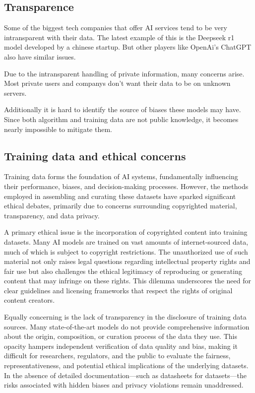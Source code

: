 \cite{AiDataBias}

\subsection{Transparence}
\label{subsec:transparence}

Some of the biggest tech companies that offer AI services tend to be very intransparent with their data. 
The latest example of this is the Deepseek r1 model developed by a chinese startup. But other players like OpenAi's ChatGPT also have similar issues.

Due to the intransparent handling of private information, many concerns arise. Most private users and companys don't want their data to be on unknown servers.

Additionally it is hard to identify the source of biases these models may have. Since both algorithm and training data are not public knowledge, it becomes nearly impossible to mitigate them.

\cite{AiTransparancy}

\subsection{Training data and ethical concerns}
\label{subsec:training-data-and-ethical-concerns}

Training data forms the foundation of AI systems, fundamentally influencing their performance, biases, and decision-making processes. However, the methods employed in assembling and curating these datasets have sparked significant ethical debates, primarily due to concerns surrounding copyrighted material, transparency, and data privacy.

A primary ethical issue is the incorporation of copyrighted content into training datasets. Many AI models are trained on vast amounts of internet-sourced data, much of which is subject to copyright restrictions. The unauthorized use of such material not only raises legal questions regarding intellectual property rights and fair use but also challenges the ethical legitimacy of reproducing or generating content that may infringe on these rights. This dilemma underscores the need for clear guidelines and licensing frameworks that respect the rights of original content creators.

Equally concerning is the lack of transparency in the disclosure of training data sources. Many state-of-the-art models do not provide comprehensive information about the origin, composition, or curation process of the data they use. This opacity hampers independent verification of data quality and bias, making it difficult for researchers, regulators, and the public to evaluate the fairness, representativeness, and potential ethical implications of the underlying datasets. In the absence of detailed documentation—such as datasheets for datasets—the risks associated with hidden biases and privacy violations remain unaddressed.

